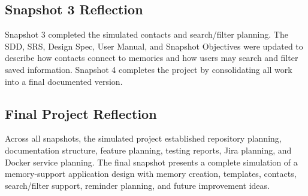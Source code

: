 \documentclass{article}
\begin{document}
\subsection{Snapshot 3 Reflection}

Snapshot 3 completed the simulated contacts and search/filter planning. The SDD, SRS, Design Spec, User Manual, and Snapshot Objectives were updated to describe how contacts connect to memories and how users may search and filter saved information. Snapshot 4 completes the project by consolidating all work into a final documented version.

\subsection{Final Project Reflection}

Across all snapshots, the simulated project established repository planning, documentation structure, feature planning, testing reports, Jira planning, and Docker service planning. The final snapshot presents a complete simulation of a memory-support application design with memory creation, templates, contacts, search/filter support, reminder planning, and future improvement ideas.
\end{document}
